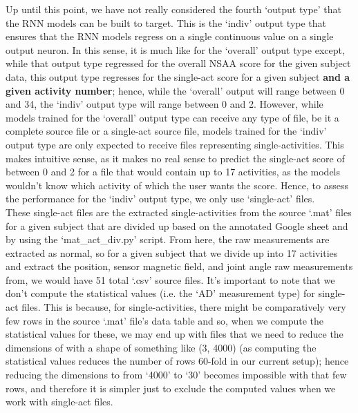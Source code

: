 \documentclass[12pt,twoside]{report}
\begin{document}
\quad Up until this point, we have not really considered the fourth ‘output type’ that the RNN models can be built to target. This is the ‘indiv’ output type that ensures that the RNN models regress on a single continuous value on a single output neuron. In this sense, it is much like for the ‘overall’ output type except, while that output type regressed for the overall NSAA score for the given subject data, this output type regresses for the single-act score for a given subject \textbf{and a given activity number}; hence, while the ‘overall’ output will range between 0 and 34, the ‘indiv’ output type will range between 0 and 2. However, while models trained for the ‘overall’ output type can receive any type of file, be it a complete source file or a single-act source file, models trained for the ‘indiv’ output type are only expected to receive files representing single-activities. This makes intuitive sense, as it makes no real sense to predict the single-act score of between 0 and 2 for a file that would contain up to 17 activities, as the models wouldn’t know which activity of which the user wants the score. Hence, to assess the performance for the ‘indiv’ output type, we only use ‘single-act’ files.\\

\quad These single-act files are the extracted single-activities from the source ‘.mat’ files for a given subject that are divided up based on the annotated Google sheet and by using the ‘mat\_act\_div.py’ script. From here, the raw measurements are extracted as normal, so for a given subject that we divide up into 17 activities and extract the position, sensor magnetic field, and joint angle raw measurements from, we would have 51 total ‘.csv’ source files. It’s important to note that we don’t compute the statistical values (i.e. the ‘AD’ measurement type) for single-act files. This is because, for single-activities, there might be comparatively very few rows in the source ‘.mat’ file’s data table and so, when we compute the statistical values for these, we may end up with files that we need to reduce the dimensions of with a shape of something like (3, 4000) (as computing the statistical values reduces the number of rows 60-fold in our current setup); hence reducing the dimensions to from ‘4000’ to ‘30’ becomes impossible with that few rows, and therefore it is simpler just to exclude the computed values when we work with single-act files.\\
\end{document}

